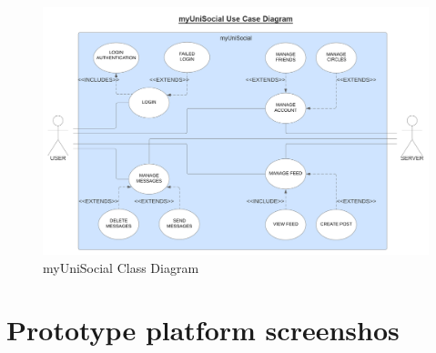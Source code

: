 \documentclass[lettersize,journal]{IEEEtran}
\begin{document}
\begin{figure}[h!]
                \includegraphics[width=0.85\paperwidth]{images/myUniSocialUseCaseDiagram.png}
                \caption{myUniSocial Class Diagram}
                \label{figure 3}
\end{figure}
\clearpage
\newpage

\section{Prototype platform screenshos}
\end{document}
